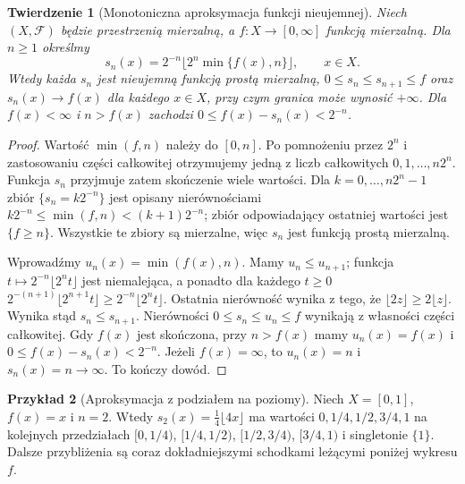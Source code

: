 \documentclass[11pt,a4paper,oneside]{book}
\numberwithin{equation}{chapter}
\theoremstyle{plain}
\newtheorem{twierdzenie}{Twierdzenie}[chapter]
\theoremstyle{definition}
\newtheorem{przyklad}[twierdzenie]{Przykład}
\theoremstyle{remark}
\begin{document}
\begin{twierdzenie}[Monotoniczna aproksymacja funkcji nieujemnej]
\label{thm:simple-up}
Niech $(X,\mathcal F)$ będzie przestrzenią mierzalną,
a $f:X\to[0,\infty]$ funkcją mierzalną. Dla
$n\ge1$ określmy
\begin{equation}\label{eq:canonical-simple}
s_n(x)=2^{-n}\Big\lfloor 2^n\min\{f(x),n\}\Big\rfloor,
\qquad x\in X.
\end{equation}
Wtedy każda $s_n$ jest nieujemną funkcją prostą mierzalną,
$0\le s_n\le s_{n+1}\le f$ oraz
$s_n(x)\to f(x)$ dla każdego $x\in X$,
przy czym granica może wynosić $+\infty$.
Dla $f(x)<\infty$ i $n>f(x)$ zachodzi
$0\le f(x)-s_n(x)<2^{-n}$.
\end{twierdzenie}
\begin{proof}
Wartość $\min(f,n)$ należy do $[0,n]$.
Po pomnożeniu przez $2^n$ i zastosowaniu części
całkowitej otrzymujemy jedną z liczb całkowitych
$0,1,\ldots,n2^n$. Funkcja $s_n$ przyjmuje zatem
skończenie wiele wartości. Dla $k=0,\ldots,n2^n-1$
zbiór $\{s_n=k2^{-n}\}$ jest opisany nierównościami
$k2^{-n}\le\min(f,n)<(k+1)2^{-n}$;
zbiór odpowiadający ostatniej wartości jest
$\{f\ge n\}$. Wszystkie te zbiory są mierzalne,
więc $s_n$ jest funkcją prostą mierzalną.

Wprowadźmy $u_n(x)=\min(f(x),n)$. Mamy
$u_n\le u_{n+1}$; funkcja
$t\mapsto 2^{-n}\lfloor2^nt\rfloor$ jest niemalejąca,
a ponadto dla każdego $t\ge0$
$2^{-(n+1)}\lfloor2^{n+1}t\rfloor\ge
2^{-n}\lfloor2^nt\rfloor$.
Ostatnia nierówność wynika z tego, że
$\lfloor2z\rfloor\ge2\lfloor z\rfloor$.
Wynika stąd $s_n\le s_{n+1}$. Nierówności
$0\le s_n\le u_n\le f$ wynikają z własności
części całkowitej. Gdy $f(x)$ jest skończona,
przy $n>f(x)$ mamy $u_n(x)=f(x)$ i
$0\le f(x)-s_n(x)<2^{-n}$.
Jeżeli $f(x)=\infty$, to $u_n(x)=n$ i
$s_n(x)=n\to\infty$. To kończy dowód.
\end{proof}

\begin{przyklad}[Aproksymacja z podziałem na poziomy]
Niech $X=[0,1]$, $f(x)=x$ i $n=2$.
Wtedy $s_2(x)=\frac14\lfloor4x\rfloor$ ma wartości
$0,1/4,1/2,3/4,1$ na kolejnych przedziałach
$[0,1/4)$, $[1/4,1/2)$, $[1/2,3/4)$,
$[3/4,1)$ i singletonie $\{1\}$.
Dalsze przybliżenia są coraz dokładniejszymi
schodkami leżącymi poniżej wykresu $f$.
\end{przyklad}
\end{document}
